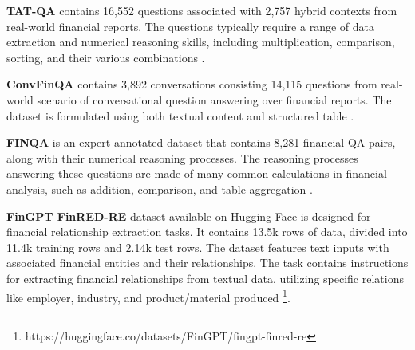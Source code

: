 \documentclass[logo,msc]{infthesis}           %
\begin{document}
\textbf{TAT-QA } contains 16,552 questions associated with 2,757 hybrid contexts from real-world financial reports. The questions typically require a range of data extraction and numerical reasoning skills, including multiplication, comparison, sorting, and their various combinations \cite{zhu-etal-2021-tat}.

\textbf{ConvFinQA } contains 3,892 conversations consisting 14,115 questions from real-world scenario of conversational question answering over financial reports. The dataset is formulated using both textual content and structured table \cite{chen2022convfinqa}. 

\textbf{FINQA } is an expert annotated dataset that contains 8,281 financial QA pairs, along with their numerical reasoning processes. The reasoning processes answering these questions are made of many common calculations in financial analysis, such as addition, comparison, and table aggregation \cite{chen2021finqa}. 

\textbf{FinGPT FinRED-RE } dataset available on Hugging Face is designed for financial relationship extraction tasks. It contains 13.5k rows of data, divided into 11.4k training rows and 2.14k test rows. The dataset features text inputs with associated financial entities and their relationships. The task contains instructions for extracting financial relationships from textual data, utilizing specific relations like employer, industry, and product/material produced \footnote{https://huggingface.co/datasets/FinGPT/fingpt-finred-re}. 
\end{document}
